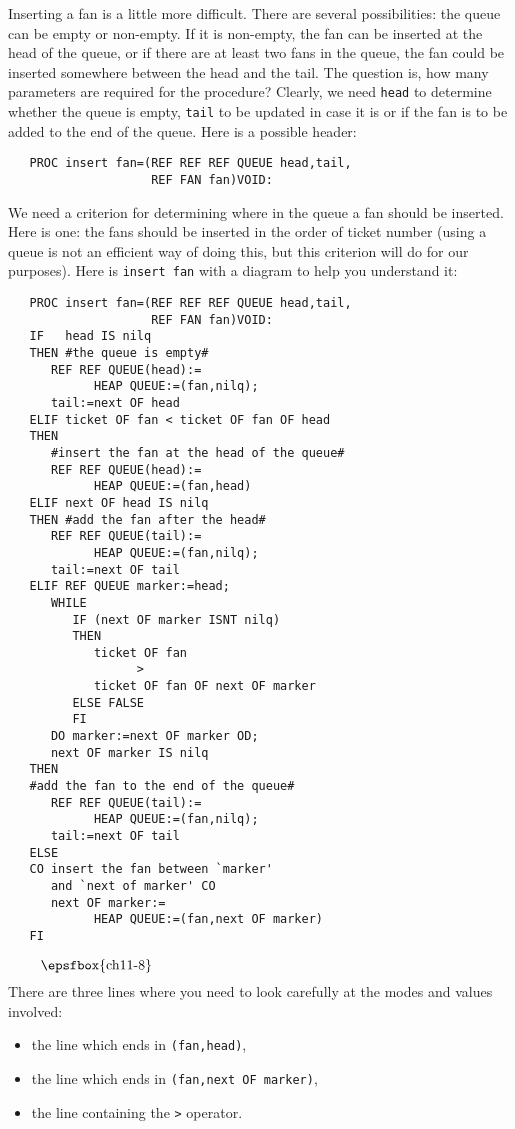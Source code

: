 Inserting a fan is a little more difficult. There are several
possibilities: the queue can be empty or non-empty. If it is
non-empty, the fan can be inserted at the head of the queue, or if
there are at least two fans in the queue, the fan could be inserted
somewhere between the head and the tail. The question is, how many
parameters are required for the procedure? Clearly, we need
\verb|head| to determine whether the queue is empty, \verb|tail| to
be updated in case it is or if the fan is to be added to the end of
the queue. Here is a possible header:
\begin{verbatim}
   PROC insert fan=(REF REF REF QUEUE head,tail,
                    REF FAN fan)VOID:
\end{verbatim}
\noindent
We need a criterion for determining where in the queue a fan should be
inserted. Here is one: the fans should be inserted in the order of
ticket number (using a queue is not an efficient way of doing this, but
this criterion will do for our purposes). Here is \verb|insert fan|
with a diagram to help you understand it:
\begin{verbatim}
   PROC insert fan=(REF REF REF QUEUE head,tail,
                    REF FAN fan)VOID:
   IF   head IS nilq
   THEN #the queue is empty#
      REF REF QUEUE(head):=
            HEAP QUEUE:=(fan,nilq);
      tail:=next OF head
   ELIF ticket OF fan < ticket OF fan OF head
   THEN
      #insert the fan at the head of the queue#
      REF REF QUEUE(head):=
            HEAP QUEUE:=(fan,head)
   ELIF next OF head IS nilq
   THEN #add the fan after the head#
      REF REF QUEUE(tail):=
            HEAP QUEUE:=(fan,nilq);
      tail:=next OF tail
   ELIF REF QUEUE marker:=head;
      WHILE
         IF (next OF marker ISNT nilq)
         THEN
            ticket OF fan
                  >
            ticket OF fan OF next OF marker
         ELSE FALSE
         FI
      DO marker:=next OF marker OD;
      next OF marker IS nilq
   THEN
   #add the fan to the end of the queue#
      REF REF QUEUE(tail):=
            HEAP QUEUE:=(fan,nilq);
      tail:=next OF tail
   ELSE
   CO insert the fan between `marker'
      and `next of marker' CO
      next OF marker:=
            HEAP QUEUE:=(fan,next OF marker)
   FI
\end{verbatim}
\noindent
$$\vbox{\epsfbox{ch11-8}}$$
There are three lines where you need to look carefully at the modes and
values involved:
\begin{itemize}
\item the line which ends in \verb|(fan,head)|,
\item the line which ends in \verb|(fan,next OF marker)|,
\item the line containing the \verb|>| operator.
\end{itemize}
